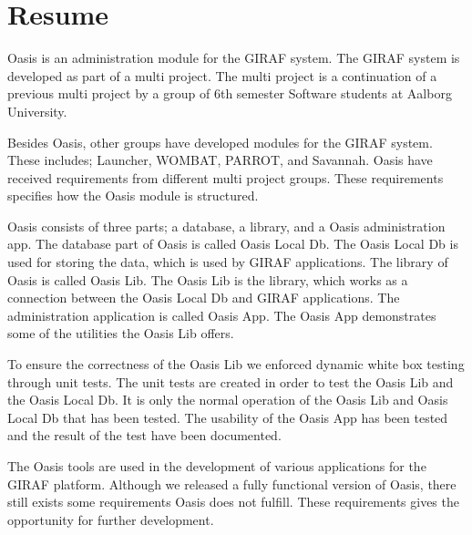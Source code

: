 \chapter*{Resume}
Oasis is an administration module for the GIRAF system. The GIRAF system is developed as part of a multi project. The multi project is a continuation of a previous multi project by a group of 6th semester Software students at Aalborg University.

Besides Oasis, other groups have developed modules for the GIRAF system. These includes; Launcher, WOMBAT, PARROT, and Savannah. Oasis have received requirements from different multi project groups. These requirements specifies how the Oasis module is structured.

Oasis consists of three parts; a database, a library, and a Oasis administration app. The database part of Oasis is called Oasis Local Db. The Oasis Local Db is used for storing the data, which is used by GIRAF applications. The library of Oasis is called Oasis Lib. The Oasis Lib is the library, which works as a connection between the Oasis Local Db and GIRAF applications. The administration application is called Oasis App. The Oasis App demonstrates some of the utilities the Oasis Lib offers.

To ensure the correctness of the Oasis Lib we enforced dynamic white box testing through unit tests. The unit tests are created in order to test the Oasis Lib and the Oasis Local Db. It is only the normal operation of the Oasis Lib and Oasis Local Db that has been tested. 
The usability of the Oasis App has been tested and the result of the test have been documented.

The Oasis tools are used in the development of various applications for the GIRAF platform. Although we released a fully functional version of Oasis, there still exists some requirements Oasis does not fulfill. These requirements gives the opportunity for further development.
